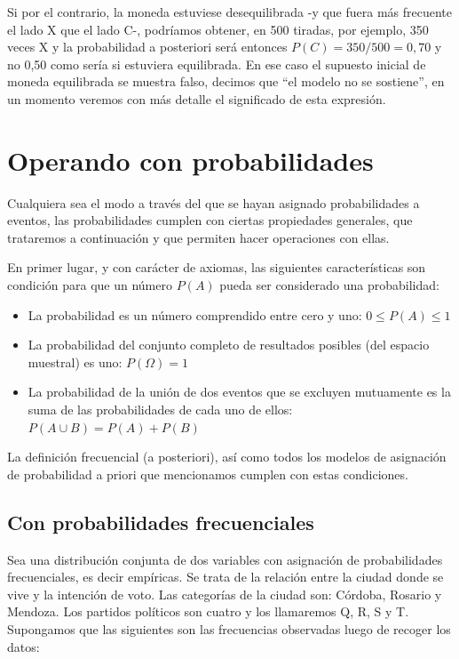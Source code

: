 \documentclass[]{book}
\begin{document}
Si por el contrario, la moneda estuviese desequilibrada -y que fuera más frecuente el lado X que el lado C-, podríamos obtener, en 500 tiradas, por ejemplo, 350 veces X y la probabilidad a posteriori será entonces \(P(C) = 350/500 = 0,70\) y no 0,50 como sería si estuviera equilibrada. En
ese caso el supuesto inicial de moneda equilibrada se muestra falso,
decimos que ``el modelo no se sostiene'', en un momento veremos con más
detalle el significado de esta expresión.

\hypertarget{operando-con-probabilidades}{%
\section{Operando con probabilidades}\label{operando-con-probabilidades}}

Cualquiera sea el modo a través del que se hayan asignado probabilidades
a eventos, las probabilidades cumplen con ciertas propiedades generales,
que trataremos a continuación y que permiten hacer operaciones con
ellas.

En primer lugar, y con carácter de axiomas, las siguientes
características son condición para que un número \(P(A)\) pueda ser
considerado una probabilidad:

\begin{itemize}
\item
  La probabilidad es un número comprendido entre cero y uno: \(0 \leq P(A) \leq 1\)
\item
  La probabilidad del conjunto completo de resultados posibles (del espacio muestral) es uno: \(P(\Omega) = 1\)
\item
  La probabilidad de la unión de dos eventos que se excluyen mutuamente es la suma de las probabilidades de cada uno de ellos: \(P(A \cup B) = P(A) + P(B)\)
\end{itemize}

La definición frecuencial (a posteriori), así como todos los modelos de
asignación de probabilidad a priori que mencionamos cumplen con estas
condiciones.

\hypertarget{con-probabilidades-frecuenciales}{%
\subsection{Con probabilidades frecuenciales}\label{con-probabilidades-frecuenciales}}

Sea una distribución conjunta de dos variables con asignación de
probabilidades frecuenciales, es decir empíricas. Se trata de la
relación entre la ciudad donde se vive y la intención de voto. Las
categorías de la ciudad son: Córdoba, Rosario y Mendoza. Los partidos
políticos son cuatro y los llamaremos Q, R, S y T. Supongamos que las
siguientes son las frecuencias observadas luego de recoger los datos:
\end{document}
